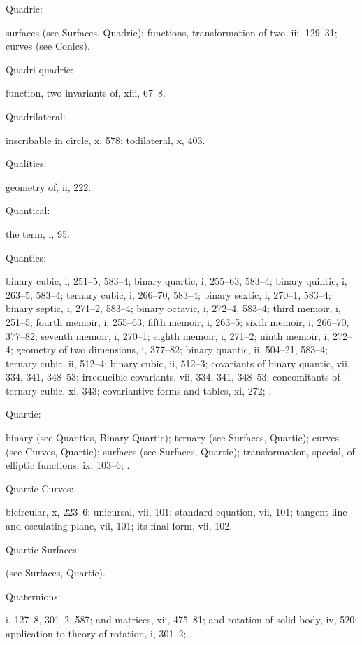 \documentclass[11pt,a4paper]{book}
\providecommand{\V}[1]{#1}
\providecommand{\IndexEntry}[2]{#1\dotfill #2\par}
\begin{document}
\IndexEntry{Quadric}: surfaces (see Surfaces, Quadric); functions, transformation of two, \V{iii}, 129--31; curves (see Conics).

\IndexEntry{Quadri-quadric}: function, two invariants of, \V{xiii}, 67--8.

\IndexEntry{Quadrilateral}: inscribable in circle, \V{x}, 578; todilateral, \V{x}, 403.

\IndexEntry{Qualities}: geometry of, \V{ii}, 222.

\IndexEntry{Quantical}: the term, \V{i}, 95.

\IndexEntry{Quantics}: binary cubic, \V{i}, 251--5, 583--4; binary quartic, \V{i}, 255--63, 583--4; binary quintic, \V{i}, 263--5, 583--4; ternary cubic, \V{i}, 266--70, 583--4; binary sextic, \V{i}, 270--1, 583--4; binary septic, \V{i}, 271--2, 583--4; binary octavic, \V{i}, 272--4, 583--4; third memoir, \V{i}, 251--5; fourth memoir, \V{i}, 255--63; fifth memoir, \V{i}, 263--5; sixth memoir, \V{i}, 266--70, 377--82; seventh memoir, \V{i}, 270--1; eighth memoir, \V{i}, 271--2; ninth memoir, \V{i}, 272--4; geometry of two dimensions, \V{i}, 377--82; binary quantic, \V{ii}, 504--21, 583--4; ternary cubic, \V{ii}, 512--4; binary cubic, \V{ii}, 512--3; covariants of binary quantic, \V{vii}, 334, 341, 348--53; irreducible covariants, \V{vii}, 334, 341, 348--53; concomitants of ternary cubic, \V{xi}, 343; covariantive forms and tables, \V{xi}, 272; .

\IndexEntry{Quartic}: binary (see Quantics, Binary Quartic); ternary (see Surfaces, Quartic); curves (see Curves, Quartic); surfaces (see Surfaces, Quartic); transformation, special, of elliptic functions, \V{ix}, 103--6; .

\IndexEntry{Quartic Curves}: bicircular, \V{x}, 223--6; unicursal, \V{vii}, 101; standard equation, \V{vii}, 101; tangent line and osculating plane, \V{vii}, 101; its final form, \V{vii}, 102.

\IndexEntry{Quartic Surfaces}: (see Surfaces, Quartic).

\newpage

\setcounter{page}{120}

\IndexEntry{Quaternions}: \V{i}, 127--8, 301--2, 587; and matrices, \V{xii}, 475--81; and rotation of solid body, \V{iv}, 520; application to theory of rotation, \V{i}, 301--2; .
\end{document}

